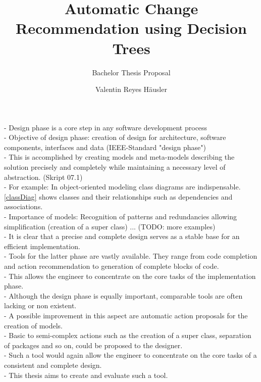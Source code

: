 \documentclass[10pt,a4paper,oneside]{scrartcl}
\title{Automatic Change Recommendation using Decision Trees}
\subtitle{Bachelor Thesis Proposal}
\author{Valentin Reyes Häusler}
\begin{document}
\maketitle

\section{}
\label{sec:motivation}

- Design phase is a core step in any software development process
\\
- Objective of design phase: creation of design for architecture, software components, interfaces and data (IEEE-Standard "design phase")
\\
- This is accomplished by creating models and meta-models describing the solution precisely and completely while maintaining a necessary level of abstraction. (Skript 07.1)
\\
- For example: In object-oriented modeling class diagrams are indispensable. \ref{classDiag} shows classes and their relationships such as dependencies and associations. 
\\
- Importance of models: 
Recognition of patterns and redundancies allowing simplification (creation of a super class) 
... (TODO: more examples)
\\
- It is clear that a precise and complete design serves as a stable base for an efficient implementation.
\\
- Tools for the latter phase are vastly available. They range from code completion and action recommendation to generation of complete blocks of code.
\\
- This allows the engineer to concentrate on the core tasks of the implementation phase.
\\
- Although the design phase is equally important, comparable tools are often lacking or non existent.
\\
- A possible improvement in this aspect are automatic action proposals for the creation of models.
\\
- Basic to semi-complex actions such as the creation of a super class, separation of packages and so on, could be proposed to the designer.
\\
- Such a tool would again allow the engineer to concentrate on the core tasks of a consistent and complete design.
\\
- This thesis aims to create and evaluate such a tool.
\\
\end{document}
